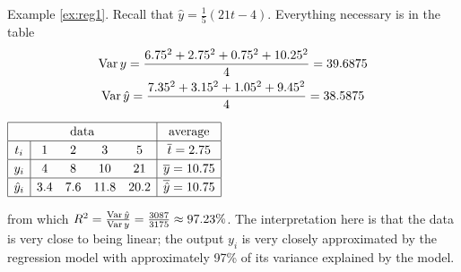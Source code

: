 \begin{tcolorbox}[exstyle]{}\vspace{-5pt}
	\begin{description}
		\begin{minipage}[t]{0.57\linewidth}\vspace{0pt}
		  \item[Example \ref{ex:reg1}.]\lstsp Recall that $\hat y=\frac 15(21t-4)$. Everything necessary is in the table
		  \begin{gather*}
		  	\operatorname{Var} y=\frac{6.75^2+2.75^2+0.75^2+10.25^2}4 =39.6875\\
		  	\operatorname{Var}\hat y=\frac{7.35^2+3.15^2+1.05^2+9.45^2}4=38.5875
		  \end{gather*}
		\end{minipage}
		\hfill
		\begin{minipage}[t]{0.42\linewidth}\vspace{0pt}
			\flushright
			$\renewcommand{\arraystretch}{1.2}
			\begin{array}{|c|cccc|c|}
				\hline
				\multicolumn{5}{|c|}{\text{data}}&\text{average}\\\hline
				t_i&1&2&3&5&\cl t=2.75\\\hline
				y_i&4&8&10&21&\cl y=10.75\\\hline
				\hat y_i&3.4&7.6&11.8&20.2&\cl{\hat y}=10.75\\\hline
			\end{array}$
		\end{minipage}\par
	
	  from which $R^2=\frac{\operatorname{Var}\hat y}{\operatorname{Var} y}=\frac{3087}{3175}\approx 97.23\%$. The interpretation here is that the data is very close to being linear; the output $y_i$ is very closely approximated by the regression model with approximately 97\% of its variance explained by the model.\par
	  

\end{description}
\end{tcolorbox}
